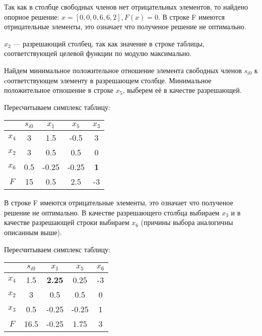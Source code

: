 \documentclass[12pt,a4paper,oneside]{extarticle}
\begin{document}
    Так как в столбце свободных членов нет отрицательных элементов, то найдено опорное решение: $x=[0, 0, 0, 6, 6, 2], F(x)=0$. В строке F имеются отрицательные элементы, это означает что полученое решение не оптимально.

    $x_2$ --- разрешающий столбец, так как значение в строке таблицы, соответствующей целевой функции по модулю максимально.

    Найдем минимальное положительное отношение элемента свободных членов $s_{i0}$ к cоответствующем элементу в разрешающем столбце. Минимальное положительное отношение в строке $x_5$, выберем её в качестве разрешающей.

    Пересчитываем симплекс таблицу:
    \begin{center}
        \begin{tabular}{|c|c|c|c|c|}
            \hline
                 & $s_{i0}$ & $x_1$ & $x_5$ & $x_3$ \\ \hline
            $x_4$ & 3       & 1.5   & -0.5  & 3  \\ \hline
            $x_2$ & 3       & 0.5   & 0.5   & 0  \\ \hline
            $x_6$ & 0.5     & -0.25 & -0.25 &{\bf 1}\\ \hline
            $F$   & 15      & 0.5   & 2.5   & -3 \\ \hline
        \end{tabular}
    \end{center}

    В строке F имеются отрицательные элементы, это означает что полученое решение не оптимально.
    В качестве разрешающего столбца выбираем $x_3$ и в качестве разрешающей строки выбираем $x_6$ (причины выбора аналогичны описанным выше).

    Пересчитываем симплекс таблицу:
    \begin{center}
        \begin{tabular}{|c|c|c|c|c|}
            \hline
                 & $s_{i0}$ & $x_1$ & $x_5$ & $x_6$ \\ \hline
            $x_4$ & 1.5   &\bf{2.25}&0.25   & -3 \\ \hline
            $x_2$ & 3       & 0.5   & 0.5   & 0  \\ \hline
            $x_3$ & 0.5     & -0.25 & -0.25 & 1 \\ \hline
            $F$   & 16.5    & -0.25 & 1.75  & 3  \\ \hline
        \end{tabular}
    \end{center}
\end{document}

